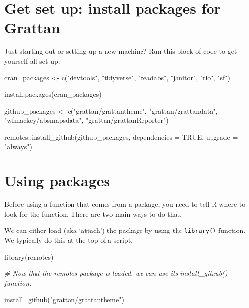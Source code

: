 \documentclass[
]{book}
\newenvironment{Shaded}{\begin{snugshade}}{\end{snugshade}}
\newcommand{\AttributeTok}[1]{\textcolor[rgb]{0.77,0.63,0.00}{#1}}
\newcommand{\CommentTok}[1]{\textcolor[rgb]{0.56,0.35,0.01}{\textit{#1}}}
\newcommand{\ConstantTok}[1]{\textcolor[rgb]{0.00,0.00,0.00}{#1}}
\newcommand{\FunctionTok}[1]{\textcolor[rgb]{0.00,0.00,0.00}{#1}}
\newcommand{\NormalTok}[1]{#1}
\newcommand{\OtherTok}[1]{\textcolor[rgb]{0.56,0.35,0.01}{#1}}
\newcommand{\SpecialCharTok}[1]{\textcolor[rgb]{0.00,0.00,0.00}{#1}}
\newcommand{\StringTok}[1]{\textcolor[rgb]{0.31,0.60,0.02}{#1}}
\begin{document}
\hypertarget{install-grattan-packages}{%
\section{Get set up: install packages for Grattan}\label{install-grattan-packages}}

Just starting out or setting up a new machine? Run this block of code to get yourself all set up:

\begin{Shaded}
\begin{Highlighting}[]
\NormalTok{cran\_packages }\OtherTok{\textless{}{-}} \FunctionTok{c}\NormalTok{(}\StringTok{"devtools"}\NormalTok{, }\StringTok{"tidyverse"}\NormalTok{, }\StringTok{"readabs"}\NormalTok{, }\StringTok{"janitor"}\NormalTok{, }
                   \StringTok{"rio"}\NormalTok{, }\StringTok{"sf"}\NormalTok{)}

\FunctionTok{install.packages}\NormalTok{(cran\_packages)}

\NormalTok{github\_packages }\OtherTok{\textless{}{-}} \FunctionTok{c}\NormalTok{(}\StringTok{"grattan/grattantheme"}\NormalTok{, }\StringTok{"grattan/grattandata"}\NormalTok{,}
                     \StringTok{"wfmackey/absmapsdata"}\NormalTok{, }\StringTok{"grattan/grattanReporter"}\NormalTok{)}

\NormalTok{remotes}\SpecialCharTok{::}\FunctionTok{install\_github}\NormalTok{(github\_packages,}
                        \AttributeTok{dependencies =} \ConstantTok{TRUE}\NormalTok{,}
                        \AttributeTok{upgrade =} \StringTok{"always"}\NormalTok{)}
\end{Highlighting}
\end{Shaded}

\hypertarget{using-packages}{%
\section{Using packages}\label{using-packages}}

Before using a function that comes from a package, you need to tell R where to look for the function. There are two main ways to do that.

We can either load (aka `attach') the package by using the \texttt{library()} function. We typically do this at the top of a script.

\begin{Shaded}
\begin{Highlighting}[]
\FunctionTok{library}\NormalTok{(remotes)}

\CommentTok{\# Now that the \textasciigrave{}remotes\textasciigrave{} package is loaded, we can use its \textasciigrave{}install\_github()\textasciigrave{} function:}

\FunctionTok{install\_github}\NormalTok{(}\StringTok{"grattan/grattantheme"}\NormalTok{)}
\end{Highlighting}
\end{Shaded}
\end{document}
